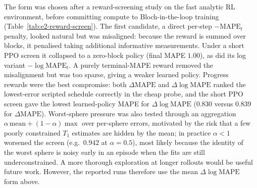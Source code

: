 The form was chosen after a reward-screening study on the fast analytic RL
environment, before committing compute to Bloch-in-the-loop training
(Table~\ref{tab:e2-reward-screen}). The first candidate, a direct per-step
$-\mathrm{MAPE}_t$ penalty, looked natural but was misaligned: because the
reward is summed over blocks, it penalised taking additional informative
measurements. Under a short PPO screen it collapsed to a zero-block policy
(final MAPE $1.00$), as did its log variant $-\log\mathrm{MAPE}_t$. A purely
terminal-MAPE reward removed the misalignment but was too sparse, giving a
weaker learned policy. Progress rewards were the best compromise:
both $\Delta\mathrm{MAPE}$ and $\Delta\log\mathrm{MAPE}$ ranked the
lowest-error scripted schedule correctly in the cheap probe, and the short
PPO screen gave the lowest learned-policy MAPE for $\Delta\log\mathrm{MAPE}$
($0.830$ versus $0.839$ for $\Delta\mathrm{MAPE}$). Worst-sphere pressure was
also tested through an aggregation
$\alpha\,\mathrm{mean}+(1-\alpha)\max$ over per-sphere errors, motivated by
the risk that a few poorly constrained $T_1$ estimates are hidden by the
mean; in practice $\alpha<1$ worsened the screen (e.g.\ $0.942$ at
$\alpha=0.5$), most likely because the identity of the worst sphere is noisy
early in an episode when the fits are still underconstrained. A more thorough exploration at longer rollouts would be useful future work. However, the reported
runs therefore use the mean $\Delta\log\mathrm{MAPE}$ form above.


